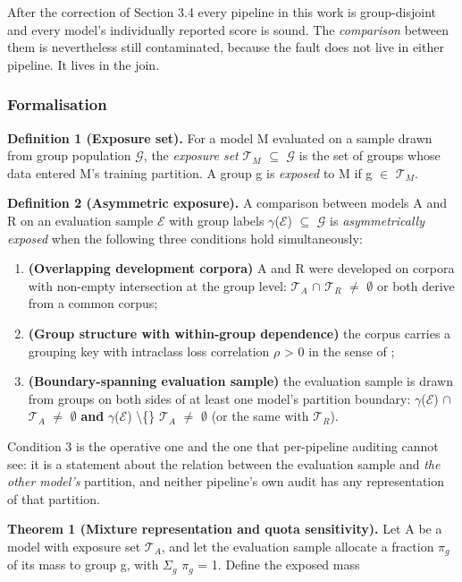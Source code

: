After the correction of Section 3.4 every pipeline in this work is group-disjoint and every model's individually reported score is sound. The \emph{comparison} between them is nevertheless still contaminated, because the fault does not live in either pipeline. It lives in the join.

\subsubsection{Formalisation}

\textbf{Definition 1 (Exposure set).} For a model M evaluated on a sample drawn from group population $\mathcal{G}$, the \emph{exposure set} $\mathcal{T}_{M}$ $\subseteq$ $\mathcal{G}$ is the set of groups whose data entered M's training partition. A group g is \emph{exposed} to M if g $\in$ $\mathcal{T}_{M}$.

\textbf{Definition 2 (Asymmetric exposure).} A comparison between models A and R on an evaluation sample $\mathcal{E}$ with group labels $\gamma$($\mathcal{E}$) $\subseteq$ $\mathcal{G}$ is \emph{asymmetrically exposed} when the following three conditions hold simultaneously:

\begin{enumerate}
\item \textbf{(Overlapping development corpora)} A and R were developed on corpora with non-empty intersection at the group level: $\mathcal{T}_{A}$ $\cap$ $\mathcal{T}_{R}$ $\neq$ $\emptyset$ or both derive from a common corpus;
\item \textbf{(Group structure with within-group dependence)} the corpus carries a grouping key with intraclass loss correlation $\rho$ > 0 in the sense of ;
\item \textbf{(Boundary-spanning evaluation sample)} the evaluation sample is drawn from groups on both sides of at least one model's partition boundary: $\gamma$($\mathcal{E}$) $\cap$ $\mathcal{T}_{A}$ $\neq$ $\emptyset$ \textbf{and} $\gamma$($\mathcal{E}$) \textbackslash\{\} $\mathcal{T}_{A}$ $\neq$ $\emptyset$ (or the same with $\mathcal{T}_{R}$).
\end{enumerate}

Condition 3 is the operative one and the one that per-pipeline auditing cannot see: it is a statement about the relation between the evaluation sample and \emph{the other model's} partition, and neither pipeline's own audit has any representation of that partition.

\textbf{Theorem 1 (Mixture representation and quota sensitivity).} Let A be a model with exposure set $\mathcal{T}_{A}$, and let the evaluation sample allocate a fraction $\pi_{g}$ of its mass to group g, with $\Sigma_{g}$ $\pi_{g}$ = 1. Define the exposed mass

